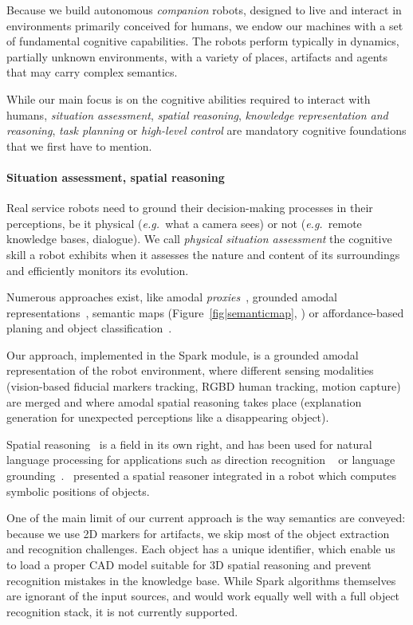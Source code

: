 \documentclass[preprint,5p]{elsarticle}
\newcommand{\eg}{{\textit{e.g.\ }}}
\begin{document}
Because we build autonomous \emph{companion} robots, designed to live and
interact in environments primarily conceived for humans, we endow our machines
with a set of fundamental cognitive capabilities. The robots perform typically
in dynamics, partially unknown environments, with a variety of places,
artifacts and agents that may carry complex semantics.

While our main focus is on the cognitive abilities required to interact with
humans, \emph{situation assessment}, \emph{spatial reasoning}, \emph{knowledge
representation and reasoning}, \emph{task planning} or \emph{high-level
control} are mandatory cognitive foundations that we first have to mention.

\paragraph{Situation assessment, spatial reasoning}

Real service robots need to ground their decision-making processes in their
perceptions, be it physical (\eg what a camera sees) or not (\eg remote
knowledge bases, dialogue). We call \emph{physical situation assessment} the
cognitive skill a robot exhibits when it assesses the nature and content of its
surroundings and efficiently monitors its evolution.

Numerous approaches exist, like amodal \emph{proxies}~\cite{Jacobsson2008},
grounded amodal representations~\cite{Mavridis2006}, semantic maps
(Figure~\ref{fig|semanticmap}, \cite{Nuechter2008, Galindo2008,Blodow2011}) or
affordance-based planing and object classification~\cite{Lorken2008,
Varadarajan2011}.

Our approach, implemented in the {\sc Spark} module, is a grounded amodal
representation of the robot environment, where different sensing modalities
(vision-based fiducial markers tracking, RGBD human tracking, motion capture)
are merged and where amodal spatial reasoning takes place (explanation
generation for unexpected perceptions like a disappearing object).

Spatial reasoning~\cite{O'Keefe1999} is a field in its own right, and has been
used for natural language processing for applications such as direction
recognition ~\cite{Kollar2010,Matuszek2010} or language
grounding~\cite{Tellex2010}.~\cite{Skubic2004} presented a spatial reasoner
integrated in a robot which computes symbolic positions of objects.

One of the main limit of our current approach is the way semantics are
conveyed: because we use 2D markers for artifacts, we skip most of the object
extraction and recognition challenges. Each object has a unique identifier,
which enable us to load a proper CAD model suitable for 3D spatial reasoning
and prevent recognition mistakes in the knowledge base. While {\sc Spark}
algorithms themselves are ignorant of the input sources, and would work equally
well with a full object recognition stack, it is not currently supported.
\end{document}
